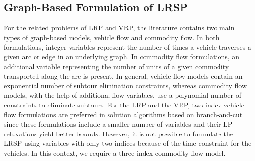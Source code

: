 \subsection{Graph-Based Formulation of LRSP}
\label{edge-based-form}

For the related problems of LRP and VRP, the literature contains two main types of
graph-based models, vehicle flow and commodity flow. In both formulations, 
integer variables represent the number of times a vehicle traverses a given arc or 
edge in an underlying graph. In commodity flow formulations, an additional variable 
representing the number of units of a given commodity transported along the arc is
present. In general, vehicle flow models contain an exponential number of subtour 
elimination constraints, whereas commodity flow models, with the help of additional 
flow variables, use a polynomial number of constraints to eliminate subtours. 
For the LRP and the VRP, two-index vehicle flow formulations are preferred 
in solution algorithms based on branch-and-cut since these formulations include 
a smaller number of variables and their LP relaxations yield better bounds. 
However, it is not possible to formulate the LRSP using variables with only two 
indices because of the time constraint for the vehicles. In this context, we require a 
three-index commodity flow model.

